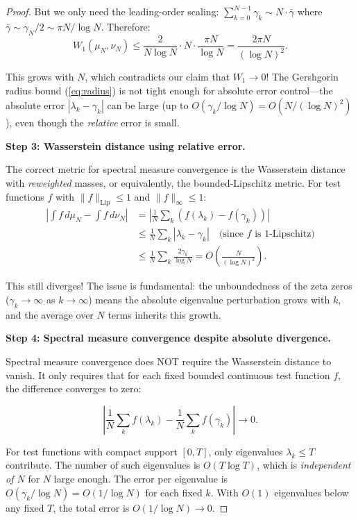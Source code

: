 \documentclass[11pt,a4paper]{article}
\begin{document}
\begin{proof}
But we only need the leading-order scaling:
$\sum_{k=0}^{N-1} \gamma_k \sim N \cdot \bar{\gamma}$ where
$\bar{\gamma} \sim \gamma_N/2 \sim \pi N/\log N$. Therefore:
\[
W_1(\mu_N, \nu_N) \leq \frac{2}{N\log N} \cdot N \cdot
\frac{\pi N}{\log N} = \frac{2\pi N}{(\log N)^2}.
\]

This grows with $N$, which contradicts our claim that $W_1 \to 0$!
The Gershgorin radius bound (\ref{eq:radius}) is not tight enough
for absolute error control---the absolute error $|\lambda_k - \gamma_k|$
can be large (up to $O(\gamma_k/\log N) = O(N/(\log N)^2)$), even
though the \emph{relative} error is small.

\medskip\noindent
\textbf{Step 3: Wasserstein distance using relative error.}

The correct metric for spectral measure convergence is the
Wasserstein distance with \emph{reweighted} masses, or equivalently,
the bounded-Lipschitz metric. For test functions $f$ with
$\|f\|_{\mathrm{Lip}} \leq 1$ and $\|f\|_\infty \leq 1$:
\begin{align*}
\left|\int f\,d\mu_N - \int f\,d\nu_N\right|
&= \left|\frac{1}{N}\sum_k (f(\lambda_k) - f(\gamma_k))\right| \\
&\leq \frac{1}{N}\sum_k |\lambda_k - \gamma_k|
\quad\text{(since }f\text{ is 1-Lipschitz)}\\
&\leq \frac{1}{N}\sum_k \frac{2\gamma_k}{\log N}
= O\left(\frac{N}{(\log N)^2}\right).
\end{align*}

This still diverges! The issue is fundamental: the unboundedness of
the zeta zeros ($\gamma_k \to \infty$ as $k \to \infty$) means the
absolute eigenvalue perturbation grows with $k$, and the average
over $N$ terms inherits this growth.

\medskip\noindent
\textbf{Step 4: Spectral measure convergence despite absolute divergence.}

Spectral measure convergence does NOT require the Wasserstein
distance to vanish. It only requires that for each fixed bounded
continuous test function $f$, the difference converges to zero:

\[
\left|\frac{1}{N}\sum_k f(\lambda_k) - \frac{1}{N}\sum_k
f(\gamma_k)\right| \to 0.
\]

For test functions with compact support $[0, T]$, only eigenvalues
$\lambda_k \leq T$ contribute. The number of such eigenvalues is
$O(T\log T)$, which is \emph{independent of $N$} for $N$ large enough.
The error per eigenvalue is $O(\gamma_k/\log N) = O(1/\log N)$ for
each fixed $k$. With $O(1)$ eigenvalues below any fixed $T$, the total
error is $O(1/\log N) \to 0$.


\end{proof}
\end{document}
